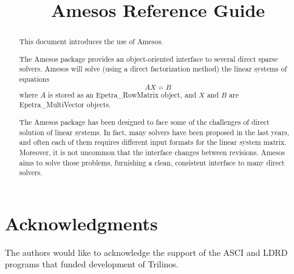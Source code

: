\documentclass[11pt]{SANDreport}
\title{Amesos Reference Guide}
\newcommand{\Amesos}{Amesos}
\begin{document}
\maketitle

\begin{abstract}
  
  This document introduces the use of \Amesos{}.
  
  The Amesos package provides an object-oriented interface to several
  direct sparse solvers. Amesos will solve (using a direct factorization
  method) the linear systems of equations
  \begin{equation}
    \label{eq:linear_system}
    A X = B
  \end{equation}
  where $A$ is stored as an Epetra\_RowMatrix object, and $X$ and $B$ are
  Epetra\_MultiVector objects.

  The Amesos package has been designed to face some of the challenges of
  direct solution of linear systems. In fact, many solvers have been
  proposed in the last years, and often each of them requires different
  input formats for the linear system matrix. Moreover, it is not uncommon
  that the interface changes between revisions. Amesos aims to solve those
  problems, furnishing a clean, consistent interface to many direct
  solvers.
  
\end{abstract}

\clearpage

\SANDmain

\tableofcontents

\clearpage

\section*{Acknowledgments}
The authors would like to acknowledge the support of the ASCI and LDRD programs
that funded development of Trilinos.

\smallskip


\smallskip


\smallskip


\clearpage
\end{document}
